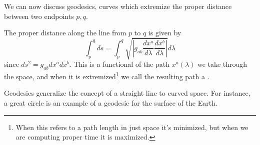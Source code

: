 We can now discuss geodesics, curves which extremize the proper distance between two endpoints $p,q$. 
\begin{defn}
The proper distance along the line from $p$ to $q$ is given by
$$\int_p^q ds = \int_p^q \sqrt{\left|g_{ab}\frac{dx^a}{d\lambda} \frac{dx^b}{d\lambda}\right|} d\lambda$$
since $ds^2=g_{ab} dx^a dx^b.$ This is a functional of the path $x^a(\lambda)$ we take through the space, and when it is extremized\footnote{When this refers to a path length in just space it's minimized, but when we are computing proper time it is maximized.} we call the resulting path a . 
\end{defn}
Geodesics generalize the concept of a straight line to curved space. For instance, a great circle is an example of a geodesic for the surface of the Earth.

